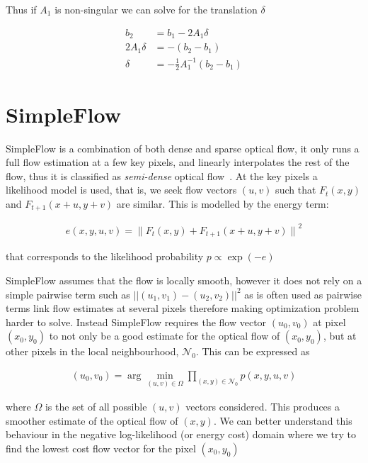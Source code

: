 Thus if $A_1$ is non-singular we can solve for the translation $\delta$

\begin{align*}
b_2 &= b_1 - 2A_1\delta \\
2A_1\delta &= -(b_2-b_1) \\
\delta &= -\frac{1}{2}A_1^{-1}(b_2-b_1)
\end{align*}

\section{SimpleFlow}

SimpleFlow is a combination of both dense and sparse optical flow, it only runs a full flow estimation at a few key pixels, and linearly interpolates the rest of the flow, thus it is classified as \textit{semi-dense} optical flow~\citep{simpleflow}. At the key pixels a likelihood model is used, that is, we seek flow vectors $(u,v)$ such that $F_t(x,y)$ and $F_{t+1}(x+u,y+v)$ are similar. This is modelled by the energy term:

\begin{align*}
e(x,y,u,v) = {\lVert F_t(x,y)+F_{t+1}(x+u,y+v)\rVert}^2 
\end{align*}

that corresponds to the likelihood probability $p \propto \exp(-e)$~\citep{rosenberg1997representing}


SimpleFlow assumes that the flow is locally smooth, however it does not rely on a simple pairwise term such as $\left|\left|(u_1,v_1)-(u_2,v_2)\right|\right|^2$ as is often used as pairwise terms link flow estimates at several pixels therefore making optimization problem harder to solve. Instead SimpleFlow requires the flow vector $(u_0,v_0)$ at pixel $(x_0, y_0)$ to not only be a good estimate for the optical flow of $(x_0, y_0)$, but at other pixels in the local neighbourhood, $\mathcal{N}_0$. This can be expressed as

\begin{align*}
  (u_0,v_0) = \arg\min_{(u,v)\in\Omega}\prod_{(x,y)\in\mathcal{N}_0}p(x,y,u,v)
\end{align*}

where $\Omega$ is the set of all possible $(u,v)$ vectors considered. This produces a smoother estimate of the optical flow of $(x, y)$. We can better understand this behaviour in the negative log-likelihood (or energy cost) domain where we try to find the lowest cost flow vector for the pixel $(x_0,y_0)$

